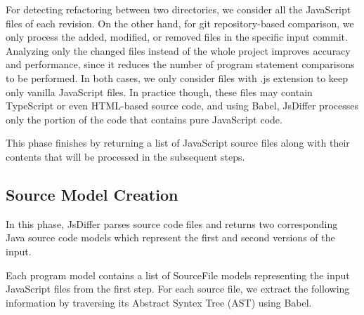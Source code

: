 \documentclass[letterpaper,12pt,onecolumn,final]{report}
\begin{document}
For detecting refactoring between two directories, we consider all the JavaScript files of each revision. On the other hand, for git repository-based comparison, we only process the added, modified, or removed files in the specific input commit. Analyzing only the changed files instead of the whole project improves accuracy and performance, since it reduces the number of program statement comparisons to be performed. In both cases, we only consider files with .js extension to keep only vanilla JavaScript files. In practice though, these files may contain TypeScript or even HTML-based source code, and using Babel, JsDiffer processes only the portion of the code that contains pure JavaScript code.

This phase finishes by returning a list of JavaScript source files along with their contents that will be processed in the subsequent steps.

\subsection {Source Model Creation}
In this phase, JsDiffer parses source code files and returns two corresponding Java source code models which represent the first and second versions of the input.

Each program model contains a list of SourceFile models representing the input JavaScript files from the first step. For each source file, we extract the following information by traversing its Abstract Syntex Tree (AST) using Babel.
\end{document}
